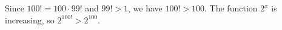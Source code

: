 Since $100!=100\cdot99!$ and $99!>1$, we have $100!>100$. The function $2^x$ is increasing, so $\boxed{2^{100!}>2^{100}}$.
